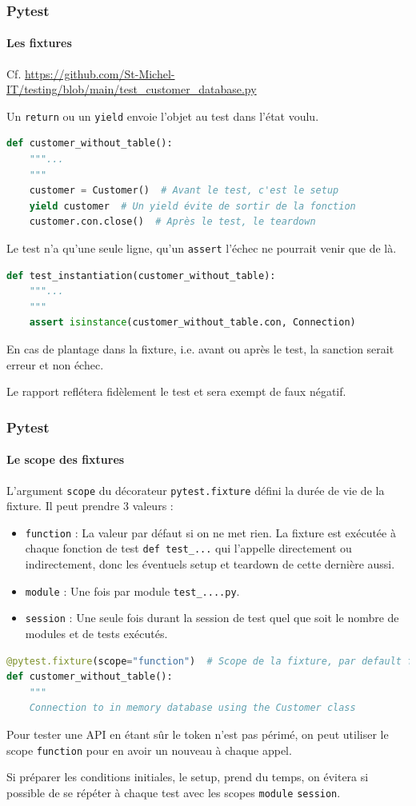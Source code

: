 \documentclass{beamer}
\begin{document}
    \begin{frame}[fragile]
        \frametitle{Pytest}
        \framesubtitle{Les fixtures}
        \transdissolve
        Cf. \url{https://github.com/St-Michel-IT/testing/blob/main/test_customer_database.py}

        Un \lstinline{return} ou un \lstinline{yield} envoie l'objet au test dans l'état voulu.
        \begin{lstlisting}[language=Python]
def customer_without_table():
    """...
    """
    customer = Customer()  # Avant le test, c'est le setup
    yield customer  # Un yield évite de sortir de la fonction
    customer.con.close()  # Après le test, le teardown
        \end{lstlisting}
        Le test n'a qu'une seule ligne, qu'un \lstinline{assert} l'échec ne
        pourrait venir que de là.
        \begin{lstlisting}[language=Python]
def test_instantiation(customer_without_table):
    """...
    """
    assert isinstance(customer_without_table.con, Connection)
        \end{lstlisting}
        En cas de plantage dans la fixture, i.e. avant ou après le test, la sanction
        serait erreur et non échec.

        Le rapport reflétera fidèlement le test et sera exempt de faux négatif.
    \end{frame}

    \begin{frame}[fragile]
        \frametitle{Pytest}
        \framesubtitle{Le scope des fixtures}
        \transdissolve
        L'argument \lstinline{scope} du décorateur \lstinline{pytest.fixture} défini la durée de vie
        de la fixture. Il peut prendre 3 valeurs :
        \begin{itemize}
            \item \lstinline{function} : La valeur par défaut si on ne met rien.
            La fixture est exécutée à chaque fonction de test \lstinline{def test_...} qui l'appelle directement ou indirectement, donc les éventuels setup et teardown de cette dernière aussi.
            \item \lstinline{module} : Une fois par module \lstinline{test_....py}.
            \item \lstinline{session} : Une seule fois durant la session de test quel que soit le nombre de modules et de tests exécutés.
        \end{itemize}
        \begin{lstlisting}[language=Python]
@pytest.fixture(scope="function")  # Scope de la fixture, par default function
def customer_without_table():
    """
    Connection to in memory database using the Customer class
        \end{lstlisting}

        Pour tester une API en étant sûr le token n'est pas périmé, on peut utiliser le scope \lstinline{function} pour en avoir un nouveau à chaque appel.

        Si préparer les conditions initiales, le setup, prend du temps, on évitera si possible de se répéter à chaque test avec les scopes \lstinline{module} \lstinline{session}.
    \end{frame}
\end{document}
